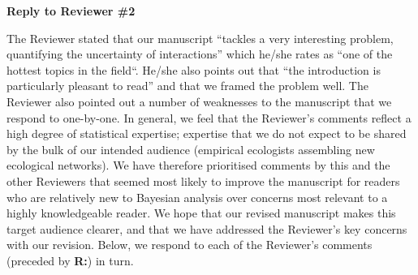 \documentclass[12pt]{letter}
\begin{document}


\clearpage


{\Large \bf Reply to Reviewer \#2} 

	The Reviewer stated that our manuscript ``tackles a very interesting problem, quantifying the uncertainty of interactions'' which he/she rates as ``one of the hottest topics in the field``. He/she also points out that ``the introduction is particularly pleasant to read'' and that we framed the problem well. The Reviewer also pointed out a number of weaknesses to the manuscript that we respond to one-by-one. In general, we feel that the Reviewer's comments reflect a high degree of statistical expertise; expertise that we do not expect to be shared by the bulk of our intended audience (empirical ecologists assembling new ecological networks). We have therefore prioritised comments by this and the other Reviewers that seemed most likely to improve the manuscript for readers who are relatively new to Bayesian analysis over concerns most relevant to a highly knowledgeable reader. We hope that our revised manuscript makes this target audience clearer, and that we have addressed the Reviewer's key concerns with our revision. Below, we respond to each of the Reviewer's comments (preceded by \textbf{R:}) in turn.
\end{document}
